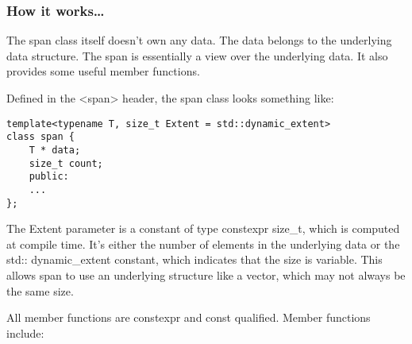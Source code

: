 \subsubsection{How it works…}

The span class itself doesn't own any data. The data belongs to the underlying data structure. The span is essentially a view over the underlying data. It also provides some useful member functions.

Defined in the <span> header, the span class looks something like:

\begin{lstlisting}[style=styleCXX]
template<typename T, size_t Extent = std::dynamic_extent>
class span {
	T * data;
	size_t count;
	public:
	...
};
\end{lstlisting}

The Extent parameter is a constant of type constexpr size\_t, which is computed at compile time. It's either the number of elements in the underlying data or the std:: dynamic\_extent constant, which indicates that the size is variable. This allows span to use an underlying structure like a vector, which may not always be the same size.

All member functions are constexpr and const qualified. Member functions include:

